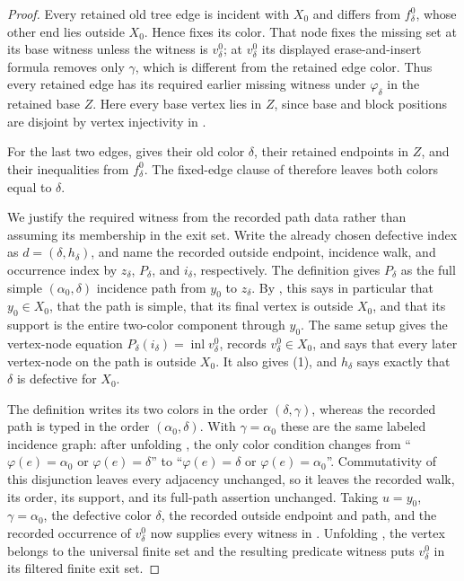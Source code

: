 \begin{proof}
Every retained old tree edge is incident with $X_0$ and differs from
$f^0_\delta$, whose other end lies outside $X_0$.  Hence
 fixes its color.  That node fixes
the missing set at its base witness unless the witness is $v^0_\delta$;
at $v^0_\delta$ its displayed erase-and-insert formula removes only
$\gamma$, which is different from the retained edge color.  Thus every
retained edge has its required earlier missing witness under
$\varphi_\delta$ in the retained base $Z$.  Here every base vertex lies in
$Z$, since base and block positions are disjoint by vertex injectivity in
.

For the last two edges,  gives their old
color $\delta$, their retained endpoints in $Z$, and their inequalities
from $f^0_\delta$.  The fixed-edge clause of
 therefore leaves both colors equal
to $\delta$.

We justify the required witness from the recorded path data rather than
assuming its membership in the exit set.  Write the already chosen
defective index as $d=(\delta,h_\delta)$, and name the recorded outside
endpoint, incidence walk, and occurrence index by
$z_\delta$, $P_\delta$, and $i_\delta$, respectively.  The definition
 gives $P_\delta$ as the full simple
$(\alpha_0,\delta)$ incidence path from $y_0$ to $z_\delta$.  By
, this says in particular that
$y_0\in X_0$, that the path is simple, that its final vertex is outside
$X_0$, and that its support is the entire two-color component through
$y_0$.  The same setup gives the vertex-node equation
$P_\delta(i_\delta)=\operatorname{inl}v^0_\delta$, records
$v^0_\delta\in X_0$, and says that every later vertex-node on the path is
outside $X_0$.  It also gives (1), and $h_\delta$ says exactly that
$\delta$ is defective for $X_0$.

The definition  writes its two colors in the
order $(\delta,\gamma)$, whereas the recorded path is typed in the order
$(\alpha_0,\delta)$.  With $\gamma=\alpha_0$ these are the same labeled
incidence graph: after unfolding , the
only color condition changes from
``$\varphi(e)=\alpha_0$ or $\varphi(e)=\delta$'' to
``$\varphi(e)=\delta$ or $\varphi(e)=\alpha_0$''.  Commutativity of this
disjunction leaves every adjacency unchanged, so it leaves the recorded
walk, its order, its support, and its full-path assertion unchanged.
Taking $u=y_0$, $\gamma=\alpha_0$, the defective color $\delta$, the
recorded outside endpoint and path, and the recorded occurrence of
$v^0_\delta$ now supplies every witness in
.  Unfolding
, the vertex belongs to the universal finite
set and the resulting predicate witness puts $v^0_\delta$ in its filtered
finite exit set.


\end{proof}
